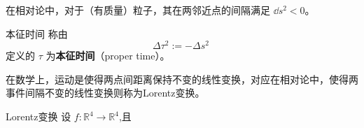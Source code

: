 在相对论中，对于（有质量）粒子，其在两邻近点的间隔满足 $\dd s^2<0$。
\begin{definition}{本征时间}
称由
\begin{equation}
\Delta \tau^2:=-\Delta s^2~
\end{equation}
定义的 $\tau$ 为\textbf{本征时间}（proper time）。
\end{definition}

在数学上，运动是使得两点间距离保持不变的线性变换，对应在相对论中，使得两事件间隔不变的线性变换则称为Lorentz变换。
\begin{definition}{Lorentz变换}
设 $f:\mathbb R^4\rightarrow\mathbb R^4$,且
\end{definition}




















